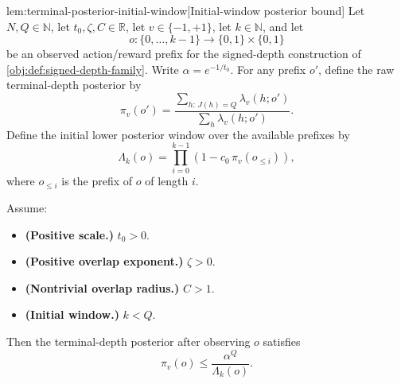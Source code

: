 \documentclass[11pt]{article}
\begin{document}
\begin{lemmav}{lem:terminal-posterior-initial-window}[Initial-window posterior bound]
Let \(N,Q\in\mathbb N\), let \(t_0,\zeta,C\in\mathbb R\), let \(v\in\{-1,+1\}\), let \(k\in\mathbb N\), and let
\[
o:\{0,\ldots,k-1\}\to \{0,1\}\times\{0,1\}
\]
be an observed action/reward prefix for the signed-depth construction of \cref{obj:def:signed-depth-family}.  Write \(\alpha=e^{-1/t_0}\).  For any prefix \(o'\), define the raw terminal-depth posterior by
\[
\pi_v(o')
=
\frac{\sum_{h:\,J(h)=Q}\lambda_v(h;o')}
     {\sum_h \lambda_v(h;o')}.
\]
Define the initial lower posterior window over the available prefixes by
\[
\Lambda_k(o)
=
\prod_{i=0}^{k-1}
\left(1-c_0\,\pi_v(o_{\le i})\right),
\]
where \(o_{\le i}\) is the prefix of \(o\) of length \(i\).

Assume:
\begin{itemize}
\item \textbf{(Positive scale.)} \(t_0>0\).
\item \textbf{(Positive overlap exponent.)} \(\zeta>0\).
\item \textbf{(Nontrivial overlap radius.)} \(C>1\).
\item \textbf{(Initial window.)} \(k<Q\).
\end{itemize}
Then the terminal-depth posterior after observing \(o\) satisfies
\[
\pi_v(o)\le \frac{\alpha^Q}{\Lambda_k(o)}.
\]
\end{lemmav}
\end{document}
